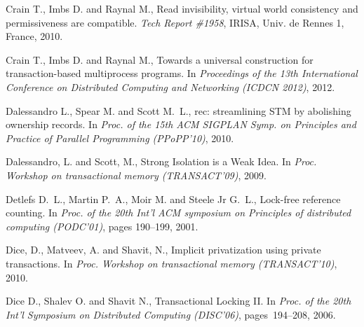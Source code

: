\begin{thebibliography}{99}
{%



Crain T., Imbs D. and Raynal M.,
Read invisibility, virtual world consistency and  permissiveness
are compatible.
{\it Tech Report \#1958}, IRISA, Univ. de  Rennes 1, France, 2010. 



Crain T., Imbs D. and Raynal M.,
Towards a universal construction for transaction-based multiprocess programs.
In {\it Proceedings of the 13th International Conference on Distributed Computing and Networking (ICDCN 2012)}, 2012.




Dalessandro L., Spear M. and Scott M.~L.,
rec: streamlining {STM} by abolishing ownership records.
\newblock In {\em Proc. of the 15th ACM SIGPLAN Symp. on Principles and
  Practice of Parallel Programming (PPoPP'10)}, 2010.





Dalessandro, L. and Scott, M.,
\newblock Strong Isolation is a Weak Idea. 
\newblock In {\it Proc. Workshop on transactional memory (TRANSACT'09)}, 2009.




Detlefs D.~L., Martin P.~A., Moir M. and Steele Jr G.~L.,
\newblock Lock-free reference counting.
\newblock In {\em Proc. of the 20th  Int'l ACM symposium on Principles of distributed computing (PODC'01)}, pages 190--199, 2001.


Dice, D., Matveev, A. and  Shavit, N.,
\newblock Implicit privatization using private transactions. 
\newblock In {\em Proc. Workshop on transactional memory (TRANSACT'10)}, 2010.


Dice D., Shalev O. and Shavit N.,
Transactional Locking II.
In {\em Proc. of the 20th Int'l Symposium on Distributed Computing (DISC'06)}, pages~194--208, 2006.

}
\end{thebibliography}
